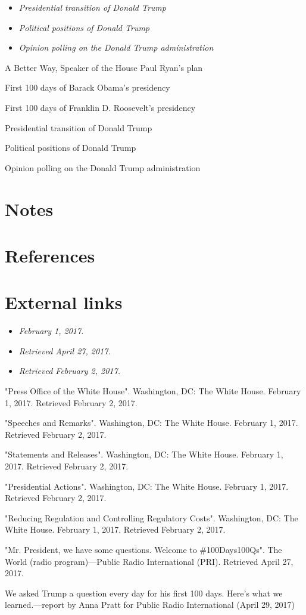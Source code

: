 \begin{itemize}
\item
  \emph{Presidential transition of Donald Trump}
\item
  \emph{Political positions of Donald Trump}
\item
  \emph{Opinion polling on the Donald Trump administration}
\end{itemize}

A Better Way, Speaker of the House Paul Ryan's plan

First 100 days of Barack Obama's presidency

First 100 days of Franklin D. Roosevelt's presidency

Presidential transition of Donald Trump

Political positions of Donald Trump

Opinion polling on the Donald Trump administration

\section{Notes}\label{notes}

\section{References}\label{references}

\section{External links}\label{external-links}

\begin{itemize}
\item
  \emph{February 1, 2017.}
\item
  \emph{Retrieved April 27, 2017.}
\item
  \emph{Retrieved February 2, 2017.}
\end{itemize}

"Press Office of the White House". Washington, DC: The White House.
February 1, 2017. Retrieved February 2, 2017.

"Speeches and Remarks". Washington, DC: The White House. February 1,
2017. Retrieved February 2, 2017.

"Statements and Releases". Washington, DC: The White House. February 1,
2017. Retrieved February 2, 2017.

"Presidential Actions". Washington, DC: The White House. February 1,
2017. Retrieved February 2, 2017.

"Reducing Regulation and Controlling Regulatory Costs". Washington, DC:
The White House. February 1, 2017. Retrieved February 2, 2017.

"Mr. President, we have some questions. Welcome to \#100Days100Qs". The
World (radio program)---Public Radio International (PRI). Retrieved
April 27, 2017.

We asked Trump a question every day for his first 100 days. Here's what
we learned.---report by Anna Pratt for Public Radio International (April
29, 2017)
